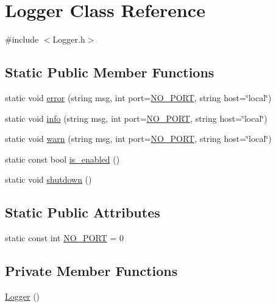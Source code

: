 \hypertarget{classLogger}{
\section{Logger Class Reference}
\label{classLogger}
}


{\ttfamily \#include $<$Logger.h$>$}

\subsection*{Static Public Member Functions}
\begin{DoxyCompactItemize}
\item 
static void \hyperlink{classLogger_adb709be72ac3e448f2af97b9cafaef2f}{error} (string msg, int port=\hyperlink{classLogger_a5ec2e368c2190d33a096925d96309b32}{NO\_\-PORT}, string host=\char`\"{}local\char`\"{})
\item 
static void \hyperlink{classLogger_a8c7d9b42b9a5480dceed15a21a2d57c6}{info} (string msg, int port=\hyperlink{classLogger_a5ec2e368c2190d33a096925d96309b32}{NO\_\-PORT}, string host=\char`\"{}local\char`\"{})
\item 
static void \hyperlink{classLogger_ae0ebb73647360cb425de15cb9790563d}{warn} (string msg, int port=\hyperlink{classLogger_a5ec2e368c2190d33a096925d96309b32}{NO\_\-PORT}, string host=\char`\"{}local\char`\"{})
\item 
static const bool \hyperlink{classLogger_a29dfeca29285b06316a9644347ba480b}{is\_\-enabled} ()
\item 
static void \hyperlink{classLogger_a9dbb809282232adfbe81a780077e587a}{shutdown} ()
\end{DoxyCompactItemize}
\subsection*{Static Public Attributes}
\begin{DoxyCompactItemize}
\item 
static const int \hyperlink{classLogger_a5ec2e368c2190d33a096925d96309b32}{NO\_\-PORT} = 0
\end{DoxyCompactItemize}
\subsection*{Private Member Functions}
\begin{DoxyCompactItemize}
\item 
\hyperlink{classLogger_abc41bfb031d896170c7675fa96a6b30c}{Logger} ()
\end{DoxyCompactItemize}
